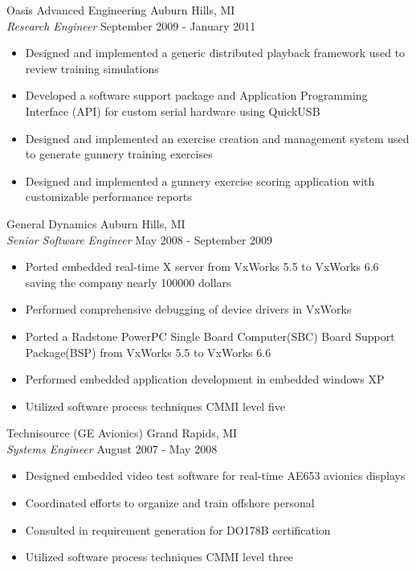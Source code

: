 \documentclass[line]{res}
\begin{document}
\begin{resume}
    \vspace{-2mm}
    Oasis Advanced Engineering \hfill Auburn Hills, MI\\
    {\sl Research Engineer} \hfill September 2009 - January 2011
    \vspace{1mm}
    \begin{itemize} 
       \item Designed and implemented a generic distributed playback framework
         used to review training simulations
       \item Developed a software support package and Application Programming
         Interface (API) for custom serial hardware using QuickUSB   
       \item Designed and implemented an exercise creation and management system used
         to generate gunnery training exercises 
       \item Designed and implemented a gunnery exercise scoring application with customizable performance reports
    \end{itemize}

    \vspace{-2mm}
    General Dynamics \hfill Auburn Hills, MI\\
    {\sl Senior Software Engineer} \hfill May 2008 - September 2009
    \vspace{1mm}
    \begin{itemize} 
       \item Ported embedded real-time X server from VxWorks 5.5 to
         VxWorks 6.6 saving the company nearly 100000 dollars
       \item Performed comprehensive debugging of device drivers in VxWorks
       \item Ported a Radstone PowerPC Single Board Computer(SBC) Board Support
         Package(BSP) from VxWorks 5.5 to VxWorks 6.6
       \item Performed embedded application development in embedded windows XP
       \item Utilized software process techniques CMMI level five
    \end{itemize}

    \vspace{-2mm}
    Technisource (GE Avionics) \hfill Grand Rapids, MI\\
    {\sl Systems Engineer} \hfill August 2007 - May 2008
    \vspace{1mm}
    \begin{itemize} 
      \item Designed embedded video test software for real-time AE653
        avionics displays
      \item Coordinated efforts to organize and train offshore personal
      \item Consulted in requirement generation for DO178B certification
      \item Utilized software process techniques CMMI level three
    \end{itemize}


\end{resume}
\end{document}
